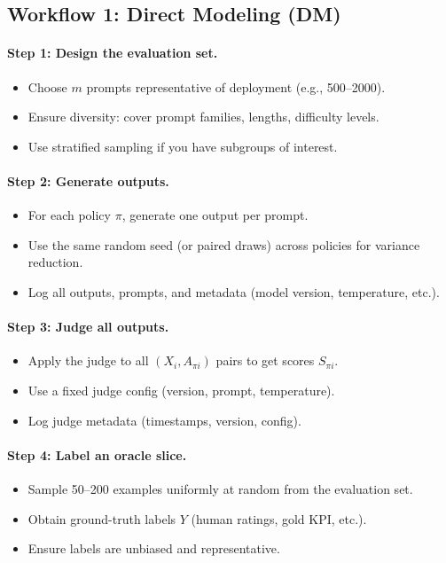 \subsection{Workflow 1: Direct Modeling (DM)}

\paragraph{Step 1: Design the evaluation set.}
\begin{itemize}
\item Choose $m$ prompts representative of deployment (e.g., 500--2000).
\item Ensure diversity: cover prompt families, lengths, difficulty levels.
\item Use stratified sampling if you have subgroups of interest.
\end{itemize}

\paragraph{Step 2: Generate outputs.}
\begin{itemize}
\item For each policy $\pi$, generate one output per prompt.
\item Use the same random seed (or paired draws) across policies for variance reduction.
\item Log all outputs, prompts, and metadata (model version, temperature, etc.).
\end{itemize}

\paragraph{Step 3: Judge all outputs.}
\begin{itemize}
\item Apply the judge to all $(X_i, A_{\pi i})$ pairs to get scores $S_{\pi i}$.
\item Use a fixed judge config (version, prompt, temperature).
\item Log judge metadata (timestamps, version, config).
\end{itemize}

\paragraph{Step 4: Label an oracle slice.}
\begin{itemize}
\item Sample 50--200 examples uniformly at random from the evaluation set.
\item Obtain ground-truth labels $Y$ (human ratings, gold KPI, etc.).
\item Ensure labels are unbiased and representative.
\end{itemize}

